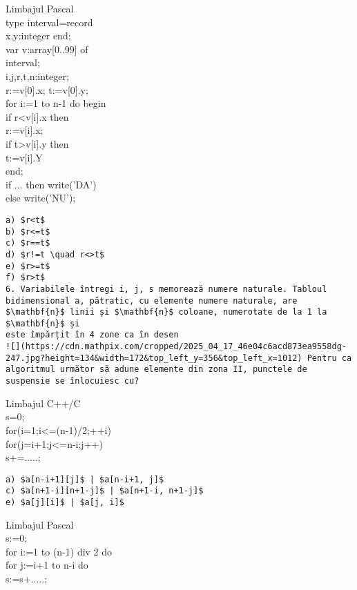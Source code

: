 \begin{verbatim}

\end{verbatim}

Limbajul Pascal\\
type interval=record\\
x,y:integer end;\\[0pt]
var v:array[0..99] of\\
interval;\\
i,j,r,t,n:integer;\\[0pt]
r:=v[0].x; t:=v[0].y;\\
for i:=1 to n-1 do begin\\[0pt]
if r<v[i].x then\\[0pt]
r:=v[i].x;\\[0pt]
if t>v[i].y then\\[0pt]
t:=v[i].Y\\
end;\\
if ... then write('DA')\\
else write('NU');

\begin{verbatim}
a) $r<t$
b) $r<=t$
c) $r==t$
d) $r!=t \quad r<>t$
e) $r>=t$
f) $r>t$
6. Variabilele întregi i, j, s memorează numere naturale. Tabloul bidimensional a, pătratic, cu elemente numere naturale, are $\mathbf{n}$ linii și $\mathbf{n}$ coloane, numerotate de la 1 la $\mathbf{n}$ și
este împărțit în 4 zone ca în desen
![](https://cdn.mathpix.com/cropped/2025_04_17_46e04c6acd873ea9558dg-247.jpg?height=134&width=172&top_left_y=356&top_left_x=1012) Pentru ca algoritmul următor să adune elemente din zona II, punctele de suspensie se înlocuiesc cu?
\end{verbatim}

Limbajul C++/C\\
s=0;\\
for(i=1;i<=(n-1)/2;++i)\\
for(j=i+1;j<=n-i;j++)\\
s+=.....;

\begin{verbatim}
a) $a[n-i+1][j]$ | $a[n-i+1, j]$
c) $a[n+1-i][n+1-j]$ | $a[n+1-i, n+1-j]$
e) $a[j][i]$ | $a[j, i]$
\end{verbatim}

Limbajul Pascal\\
s:=0;\\
for i:=1 to (n-1) div 2 do\\
for j:=i+1 to n-i do\\
s:=s+.....;

